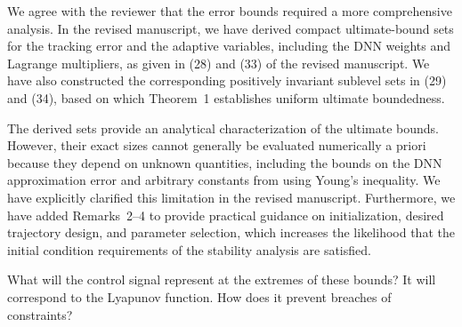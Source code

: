 \documentclass[12pt,english]{reviewresponse}
\begin{document}
\begin{revresponse}
  We agree with the reviewer that the error bounds required a more comprehensive analysis.
  In the revised manuscript, we have derived compact ultimate-bound sets for the tracking error and the adaptive variables, including the DNN weights and Lagrange multipliers, as given in (28) and (33) of the revised manuscript.
  We have also constructed the corresponding positively invariant sublevel sets in (29) and (34), based on which Theorem~1 establishes uniform ultimate boundedness.

  \bigskip

  The derived sets provide an analytical characterization of the ultimate bounds. However, their exact sizes cannot generally be evaluated numerically a priori because they depend on unknown quantities, including the bounds on the DNN approximation error and arbitrary constants from using Young's inequality.
  We have explicitly clarified this limitation in the revised manuscript. 
  Furthermore, we have added Remarks~2--4 to provide practical guidance on initialization, desired trajectory design, and parameter selection, which increases the likelihood that the initial condition requirements of the stability analysis are satisfied.
\end{revresponse}

% 
\begin{revcomment}[1][1]{}
	What will the control signal represent at the extremes of these bounds? It will correspond to the Lyapunov function. How does it prevent breaches of constraints?
\end{revcomment}
\end{document}
